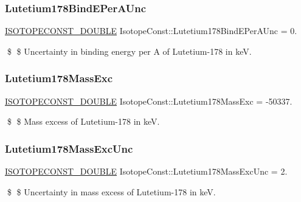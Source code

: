 \subsubsection{\texorpdfstring{Lutetium178\+Bind\+E\+Per\+A\+Unc}{Lutetium178BindEPerAUnc}}
{\footnotesize\ttfamily \mbox{\hyperlink{group___isotope_const-_macros_ga8f45a7272ce02c0b4c65c44636ed719a}{I\+S\+O\+T\+O\+P\+E\+C\+O\+N\+S\+T\+\_\+\+D\+O\+U\+B\+LE}} Isotope\+Const\+::\+Lutetium178\+Bind\+E\+Per\+A\+Unc = 0.}

\$ \$ Uncertainty in binding energy per A of Lutetium-\/178 in keV. \mbox{\label{group___isotope_const-_lutetium-_lu178_gac4fcfbc633587a20287025cc5021f34a}} 
\subsubsection{\texorpdfstring{Lutetium178\+Mass\+Exc}{Lutetium178MassExc}}
{\footnotesize\ttfamily \mbox{\hyperlink{group___isotope_const-_macros_ga8f45a7272ce02c0b4c65c44636ed719a}{I\+S\+O\+T\+O\+P\+E\+C\+O\+N\+S\+T\+\_\+\+D\+O\+U\+B\+LE}} Isotope\+Const\+::\+Lutetium178\+Mass\+Exc = -\/50337.}

\$ \$ Mass excess of Lutetium-\/178 in keV. \mbox{\label{group___isotope_const-_lutetium-_lu178_ga632e604372ed8d9be62685b24d06b56f}} 
\subsubsection{\texorpdfstring{Lutetium178\+Mass\+Exc\+Unc}{Lutetium178MassExcUnc}}
{\footnotesize\ttfamily \mbox{\hyperlink{group___isotope_const-_macros_ga8f45a7272ce02c0b4c65c44636ed719a}{I\+S\+O\+T\+O\+P\+E\+C\+O\+N\+S\+T\+\_\+\+D\+O\+U\+B\+LE}} Isotope\+Const\+::\+Lutetium178\+Mass\+Exc\+Unc = 2.}

\$ \$ Uncertainty in mass excess of Lutetium-\/178 in keV. \mbox{\label{group___isotope_const-_lutetium-_lu178_ga62cc9164881a51a7fb6547b852a58ef6}} 
